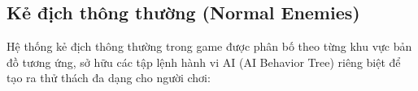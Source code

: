 \documentclass[../DoAn.tex]{subfiles}
\begin{document}
\subsection{Kẻ địch thông thường (Normal Enemies)}
\label{subsection:3.7.2}

Hệ thống kẻ địch thông thường trong game được phân bố theo từng khu vực bản đồ tương ứng, sở hữu các tập lệnh hành vi AI (AI Behavior Tree) riêng biệt để tạo ra thử thách đa dạng cho người chơi:

\end{document}
